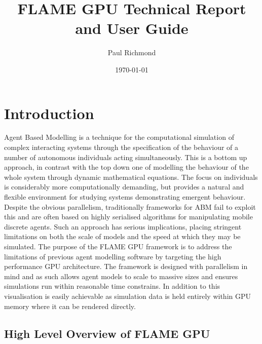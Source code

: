 \documentclass[11pt, a4paper, onecolumn, oneside]{report}
\title{FLAME GPU Technical Report and User Guide}
\author{Paul Richmond}
\date{\today}
\begin{document}
\maketitle

\tableofcontents

\chapter{Introduction}
\label{ch:1}
Agent Based Modelling is a technique for the computational simulation of complex interacting systems through the specification of the behaviour of a number of autonomous individuals acting simultaneously.
This is a bottom up approach, in contrast with the top down one of modelling the behaviour of the whole system through dynamic mathematical equations. The focus on individuals is considerably more computationally demanding, but provides a natural and flexible environment for studying systems demonstrating emergent behaviour.
Despite the obvious parallelism, traditionally frameworks for ABM fail to exploit this and are often based on highly serialised algorithms for manipulating mobile discrete agents.
Such an approach has serious implications, placing stringent limitations on both the scale of models and the speed at which they may be simulated.
The purpose of the FLAME GPU framework is to address the limitations of previous agent modelling software by targeting the high performance GPU architecture.
The framework is designed with parallelism in mind and as such allows agent models to scale to massive sizes and ensures simulations run within reasonable time constrains.
In addition to this visualisation is easily achievable as simulation data is held entirely within GPU memory where it can be rendered directly.



\section{High Level Overview of FLAME GPU}
\label{sec:11}
\end{document}
